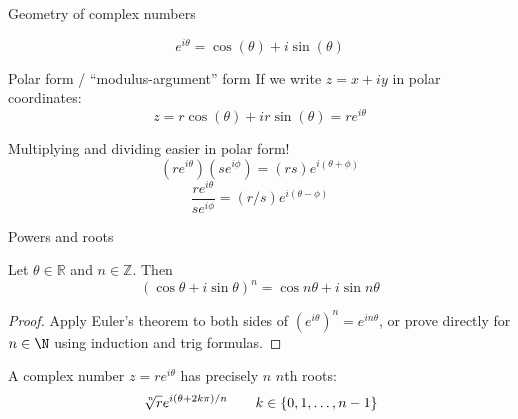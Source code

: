 \documentclass{beamer}
\newcommand{\Z}{\mathbb{Z}}
\newcommand{\R}{\mathbb{R}}
\begin{document}
\begin{frame}{Geometry of complex numbers}
  \begin{theorem}[Euler]
    $$e^{i\theta}=\cos(\theta)+i\sin(\theta)$$
  \end{theorem}
  \begin{block}{Polar form / ``modulus-argument'' form}
  If we write $z=x+iy$ in polar coordinates:
  $$z=r\cos(\theta)+ir\sin(\theta)=r e^{i\theta}$$
\end{block}
  \begin{block}{Multiplying and dividing easier in polar form!}
  $$(re^{i\theta})(se^{i\phi})=(rs)e^{i(\theta+\phi)}$$
  $$\frac{re^{i\theta}}{se^{i\phi}}=(r/s)e^{i(\theta-\phi)}$$
  \end{block}
  \end{frame}
\begin{frame}{Powers and roots}
  \begin{theorem}[De Moivre] Let $\theta\in\R$ and $n\in \Z$.  Then
    $$(\cos\theta+i\sin\theta)^n=\cos n\theta+i\sin n\theta$$
  \end{theorem}
  \begin{proof} Apply Euler's theorem to both sides of $(e^{i\theta})^n=e^{in\theta}$, or prove directly for $n\in \N$ using induction and trig formulas.   \end{proof}
  
   \begin{theorem}
    A complex number $z=re^{i\theta}$ has precisely $n$ $n$th roots:
    $$\sqrt[\leftroot{-2}\uproot{2}n]{r}e^{i(\theta+2k\pi)/n} \quad \quad k\in\{0,1,\dots,n-1\}$$
    \end{theorem}


\end{frame}
\end{document}
